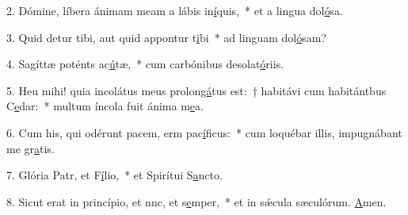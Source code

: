 2. Dómine, líbera ánimam meam a lábis in\uline{í}quis,~* et a lingua dol\uline{ó}sa.\par 
3. Quid detur tibi, aut quid appontur t\uline{i}bi~* ad linguam dol\uline{ó}sam?\par 
4. Sagíttæ poténts ac\uline{ú}tæ,~* cum carbónibus desolat\uline{ó}riis.\par 
5. Heu mihi! quia incolátus meus prolon\uline{gá}tus est:~† habitávi cum habitántbus C\uline{e}dar:~* multum íncola fuit ánima m\uline{e}a.\par 
6. Cum his, qui odérunt pacem, erm pac\uline{í}ficus:~* cum loquébar illis, impugnábant me gr\uline{a}tis.\par 
7. Glória Patr, et F\uline{í}lio,~* et Spirítui S\uline{a}ncto.\par 
8. Sicut erat in princípio, et nnc, et s\uline{e}mper,~* et in sǽcula sæculórum. \uline{A}men.\par 
